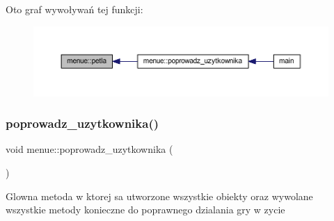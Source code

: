 Oto graf wywoływań tej funkcji\+:
\nopagebreak
\begin{figure}[H]
\begin{center}
\leavevmode
\includegraphics[width=350pt]{classmenue_a13c6c317f85272bf3fd49ff0ad93b28a_icgraph}
\end{center}
\end{figure}
\mbox{\label{classmenue_aef7d47abaf00296cef8820ac538f017e}} 
\subsubsection{\texorpdfstring{poprowadz\+\_\+uzytkownika()}{poprowadz\_uzytkownika()}}
{\footnotesize\ttfamily void menue\+::poprowadz\+\_\+uzytkownika (\begin{DoxyParamCaption}{ }\end{DoxyParamCaption})\hspace{0.3cm}{\ttfamily [static]}}

Glowna metoda w ktorej sa utworzone wszystkie obiekty oraz wywolane wszystkie metody konieczne do poprawnego dzialania gry w zycie

